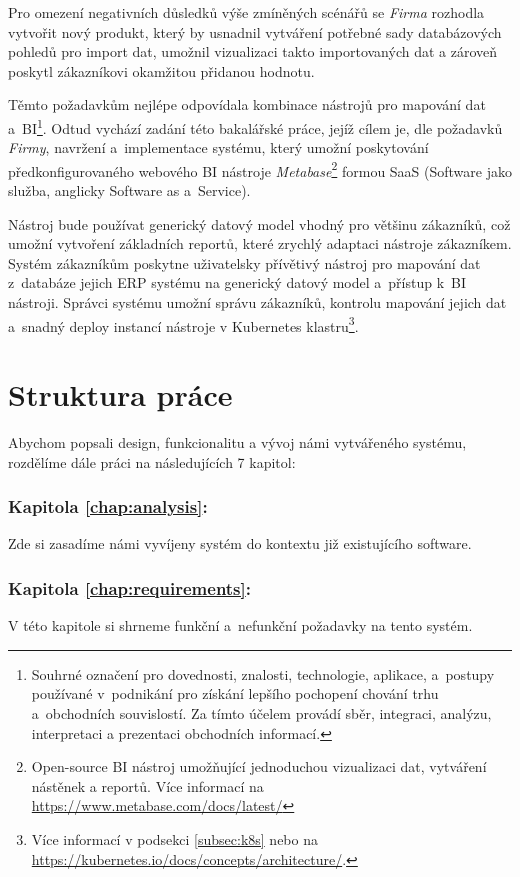 Pro omezení negativních důsledků výše zmíněných scénářů se \textit{Firma} rozhodla vytvořit nový produkt, který by usnadnil vytváření potřebné sady databázových pohledů pro import dat, umožnil vizualizaci takto importovaných dat a zároveň poskytl zákazníkovi okamžitou přidanou hodnotu.

Těmto požadavkům nejlépe odpovídala kombinace nástrojů pro mapování dat a~BI\footnote{
Souhrné označení pro dovednosti, znalosti, technologie, aplikace, a~postupy používané v~podnikání pro získání lepšího pochopení chování trhu a~obchodních souvislostí.
Za tímto účelem provádí sběr, integraci, analýzu, interpretaci a prezentaci obchodních informací.
}.
Odtud vychází zadání této bakalářské práce, jejíž cílem je, dle požadavků \textit{Firmy}, navržení a~implementace systému, který umožní poskytování předkonfigurovaného webového BI nástroje \textit{Metabase}\footnote{
Open-source BI nástroj umožňující jednoduchou vizualizaci dat, vytváření nástěnek a reportů. Více informací na \url{https://www.metabase.com/docs/latest/}
} 
formou SaaS (Software jako služba, anglicky Software as a~Service). 

Nástroj bude používat generický datový model vhodný pro většinu zákazníků, což umožní vytvoření základních reportů, které zrychlý adaptaci nástroje zákazníkem. Systém zákazníkům poskytne uživatelsky přívětivý nástroj pro mapování dat z~databáze jejich ERP systému na generický datový model a~přístup k~BI nástroji.
Správci systému umožní správu zákazníků, kontrolu mapování jejich dat a~snadný deploy instancí nástroje v Kubernetes klastru\footnote{Více informací v podsekci \ref{subsec:k8s} nebo na \url{https://kubernetes.io/docs/concepts/architecture/}.}. 

\section{Struktura práce}

Abychom popsali design, funkcionalitu a vývoj námi vytvářeného systému, rozdělíme dále práci na následujících 7 kapitol:

\subsubsection{Kapitola \ref{chap:analysis}: }
Zde si zasadíme námi vyvíjeny systém do kontextu již existujícího software.

\subsubsection{Kapitola \ref{chap:requirements}: }
V této kapitole si shrneme funkční a~nefunkční požadavky na tento systém.

